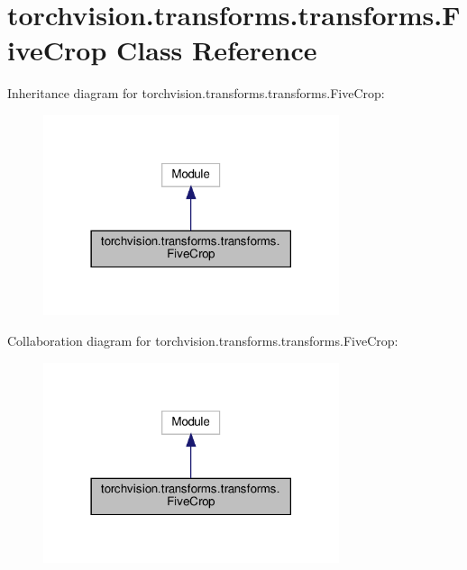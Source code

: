 \hypertarget{classtorchvision_1_1transforms_1_1transforms_1_1FiveCrop}{}\section{torchvision.\+transforms.\+transforms.\+Five\+Crop Class Reference}
\label{classtorchvision_1_1transforms_1_1transforms_1_1FiveCrop}


Inheritance diagram for torchvision.\+transforms.\+transforms.\+Five\+Crop\+:
\nopagebreak
\begin{figure}[H]
\begin{center}
\leavevmode
\includegraphics[width=246pt]{classtorchvision_1_1transforms_1_1transforms_1_1FiveCrop__inherit__graph}
\end{center}
\end{figure}


Collaboration diagram for torchvision.\+transforms.\+transforms.\+Five\+Crop\+:
\nopagebreak
\begin{figure}[H]
\begin{center}
\leavevmode
\includegraphics[width=246pt]{classtorchvision_1_1transforms_1_1transforms_1_1FiveCrop__coll__graph}
\end{center}
\end{figure}
